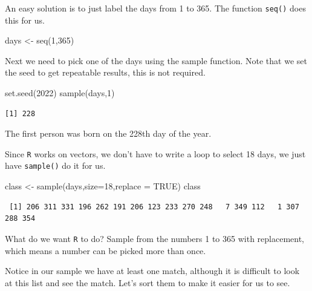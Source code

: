 \documentclass[
  letterpaper,
  DIV=11,
  numbers=noendperiod]{scrreprt}
\newenvironment{Shaded}{\begin{snugshade}}{\end{snugshade}}
\newcommand{\AttributeTok}[1]{\textcolor[rgb]{0.40,0.45,0.13}{#1}}
\newcommand{\ConstantTok}[1]{\textcolor[rgb]{0.56,0.35,0.01}{#1}}
\newcommand{\DecValTok}[1]{\textcolor[rgb]{0.68,0.00,0.00}{#1}}
\newcommand{\FunctionTok}[1]{\textcolor[rgb]{0.28,0.35,0.67}{#1}}
\newcommand{\NormalTok}[1]{\textcolor[rgb]{0.00,0.23,0.31}{#1}}
\newcommand{\OtherTok}[1]{\textcolor[rgb]{0.00,0.23,0.31}{#1}}
\begin{document}
An easy solution is to just label the days from 1 to 365. The function
\texttt{seq()} does this for us.

\begin{Shaded}
\begin{Highlighting}[]
\NormalTok{days }\OtherTok{\textless{}{-}} \FunctionTok{seq}\NormalTok{(}\DecValTok{1}\NormalTok{,}\DecValTok{365}\NormalTok{)}
\end{Highlighting}
\end{Shaded}

Next we need to pick one of the days using the sample function. Note
that we set the seed to get repeatable results, this is not required.

\begin{Shaded}
\begin{Highlighting}[]
\FunctionTok{set.seed}\NormalTok{(}\DecValTok{2022}\NormalTok{)}
\FunctionTok{sample}\NormalTok{(days,}\DecValTok{1}\NormalTok{)}
\end{Highlighting}
\end{Shaded}

\begin{verbatim}
[1] 228
\end{verbatim}

The first person was born on the 228th day of the year.

Since \texttt{R} works on vectors, we don't have to write a loop to
select 18 days, we just have \texttt{sample()} do it for us.

\begin{Shaded}
\begin{Highlighting}[]
\NormalTok{class }\OtherTok{\textless{}{-}} \FunctionTok{sample}\NormalTok{(days,}\AttributeTok{size=}\DecValTok{18}\NormalTok{,}\AttributeTok{replace =} \ConstantTok{TRUE}\NormalTok{)}
\NormalTok{class}
\end{Highlighting}
\end{Shaded}

\begin{verbatim}
 [1] 206 311 331 196 262 191 206 123 233 270 248   7 349 112   1 307 288 354
\end{verbatim}

What do we want \texttt{R} to do? Sample from the numbers 1 to 365 with
replacement, which means a number can be picked more than once.

Notice in our sample we have at least one match, although it is
difficult to look at this list and see the match. Let's sort them to
make it easier for us to see.
\end{document}
